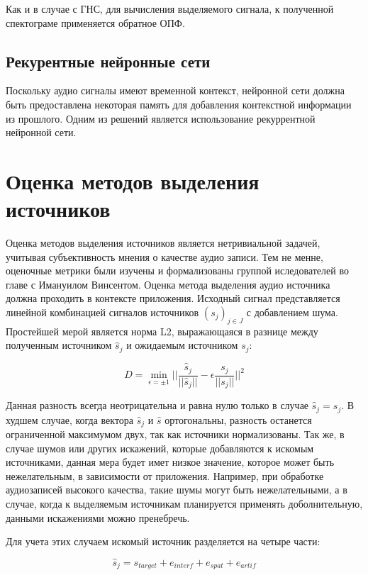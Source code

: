 Как и в случае с ГНС, для вычисления выделяемого сигнала, к полученной спектограме применяется обратное ОПФ.

\subsection{Рекурентные нейронные сети}

Поскольку аудио сигналы имеют временной контекст, нейронной сети должна быть предоставлена некоторая память для добавления контекстной информации из прошлого. Одним из решений является использование рекуррентной нейронной сети.

\section{Оценка методов выделения источников}

Оценка методов выделения источников является нетривиальной задачей, учитывая субъективность мнения о качестве аудио записи. Тем не менне, оценочные метрики были изучены и формализованы группой иследователей во главе с Имануилом Винсентом\cite{Vincent}.
Оценка метода выделения аудио источника должна проходить в контексте приложения. Исходный сигнал представляется линейной комбинацией сигналов источников $(s_j)_{j\in J}$ с добавлением шума. Простейшей мерой является норма L2, выражающаяся в разнице между полученным источником $\hat{s}_j$ и ожидаемым источником $s_j$:

\begin{equation}
D = \min_{\epsilon=\pm 1} \Bigg | \Bigg | \frac{\hat{s}_j}{||\hat{s}_j||} - \epsilon \frac{s_j}{||s_j||} \Bigg | \Bigg |^2
\end{equation}

Данная разность всегда неотрицательна и равна нулю только в случае $\hat{s}_j = s_j$. В худшем случае, когда вектора $\hat{s}_j$ и $\hat{s}$ ортогональны, разность останется ограниченной максимумом двух, так как источники нормализованы. Так же, в случае шумов или других искажений, которые добавляются к искомым источниками, данная мера будет имет низкое значение, которое может быть нежелательным, в зависимости от приложения. Например, при обработке аудиозаписей высокого качества, такие шумы могут быть нежелательными, а в случае, когда к выделяемым источникам планируется применять доболнительную, данными искажениями можно пренебречь.

Для учета этих случаем искомый источник разделяется на четыре части:

\begin{equation}
\hat{s}_j = s_{target} + e_{interf} + e_{spat} + e_{artif}
\label{anal:source}
\end{equation}

